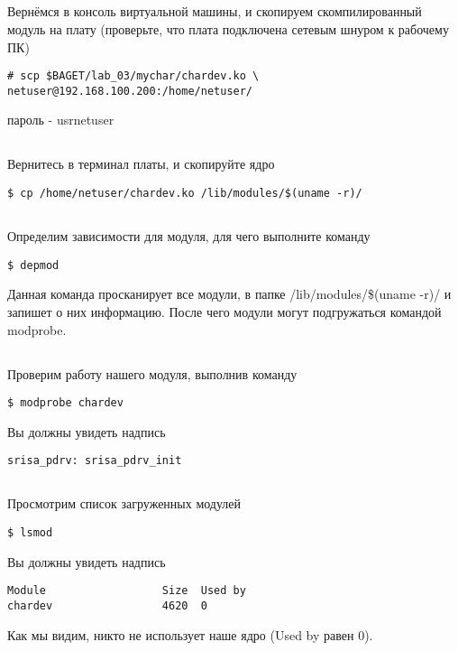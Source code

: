 \subsection{}Вернёмся в консоль виртуальной машины, и скопируем скомпилированный модуль на плату (проверьте, что плата подключена сетевым шнуром к рабочему ПК)
\begin{lstlisting}[style=bash]
# scp $BAGET/lab_03/mychar/chardev.ko \
netuser@192.168.100.200:/home/netuser/
\end{lstlisting}
пароль - usrnetuser

\subsection{}Вернитесь в терминал платы, и скопируйте ядро
\begin{lstlisting}[style=bash]
$ cp /home/netuser/chardev.ko /lib/modules/$(uname -r)/
\end{lstlisting}

\subsection{}Определим зависимости для модуля, для чего выполните команду 
\begin{lstlisting}[style=bash]
$ depmod
\end{lstlisting}
Данная команда просканирует все модули, в папке /lib/modules/\$(uname -r)/ и запишет о них информацию. После чего модули могут подгружаться командой modprobe. 

\subsection{}Проверим работу нашего модуля, выполнив команду
\begin{lstlisting}[style=bash]
$ modprobe chardev
\end{lstlisting}
Вы должны увидеть надпись 
\begin{lstlisting}[style=stdout]
srisa_pdrv: srisa_pdrv_init
\end{lstlisting}

\subsection{}Просмотрим список загруженных модулей
\begin{lstlisting}[style=bash]
$ lsmod
\end{lstlisting}
Вы должны увидеть надпись 
\begin{lstlisting}[style=stdout]
Module                  Size  Used by
chardev                 4620  0
\end{lstlisting}
Как мы видим, никто не использует наше ядро (Used by равен 0). 

